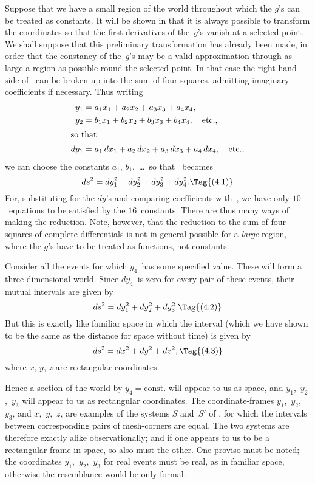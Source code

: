 \documentclass[12pt]{book}
\begin{document}
%
%

Suppose that we have a small region of the world throughout which the
$g$'s can be treated as constants\footnotemark.\footnotetext
  {It will be shown in  that it is always possible to transform the coordinates so that the
  first derivatives of the~$g$'s vanish at a selected point. We shall suppose that this preliminary
  transformation has already been made, in order that the constancy of the~$g$'s may be a valid
  approximation through as large a region as possible round the selected point.}
In that case the right-hand side of~ can
be broken up into the sum of four squares, admitting imaginary coefficients
if necessary. Thus writing
\begin{align*}
  y_{1} &= a_{1} x_{1} + a_{2} x_{2} + a_{3} x_{3} + a_{4} x_{4}, \\
  y_{2} &= b_{1} x_{1} + b_{2} x_{2} + b_{3} x_{3} + b_{4} x_{4},\quad\text{etc.,} \\
\intertext{so that}
  dy_{1} &= a_{1}\, dx_{1} + a_{2}\, dx_{2} + a_{3}\, dx_{3} + a_{4}\, dx_{4},\quad\text{etc.,}
\end{align*}
we can choose the constants $a_{1}$, $b_{1}$,~\dots\ so that ~becomes
\[
ds^{2} = dy_{1}^{2} + dy_{2}^{2} + dy_{3}^{2} + dy_{4}^{2}.
\Tag{(4.1)}
\]
For, substituting for the $dy$'s and comparing coefficients with~, we have
only $10$~equations to be satisfied by the $16$~constants. There are thus many
ways of making the reduction. Note, however, that the reduction to the sum
of four squares of complete differentials is not in general possible for a \emph{large}
region, where the $g$'s have to be treated as functions, not constants.

Consider all the events for which $y_{4}$~has some specified value. These will
form a three-dimensional world. Since $dy_{4}$~is zero for every pair of these
events, their mutual intervals are given by
\[
ds^{2} = dy_{1}^{2} + dy_{2}^{2} + dy_{3}^{2}.
\Tag{(4.2)}
\]
But this is exactly like familiar space in which the interval (which we have
shown to be the same as the distance for space without time) is given by
\[
ds^{2} = dx^{2} + dy^{2} + dz^{2},
\Tag{(4.3)}
\]
where $x$, $y$, $z$ are rectangular coordinates.

Hence a section of the world by $y_{4} = \text{const.}$ will appear to us as space, and
$y_{1}$,~$y_{2}$,~$y_{3}$ will appear to us as rectangular coordinates. The coordinate-frames
$y_{1}$,~$y_{2}$,~$y_{3}$, and $x$,~$y$,~$z$, are examples of the systems $S$ and~$S'$ of , for which
the intervals between corresponding pairs of mesh-corners are equal. The
two systems are therefore exactly alike observationally; and if one appears
to us to be a rectangular frame in space, so also must the other. One proviso
must be noted; the coordinates $y_{1}$,~$y_{2}$,~$y_{3}$ for real events must be real, as in
familiar space, otherwise the resemblance would be only formal.
\end{document}
